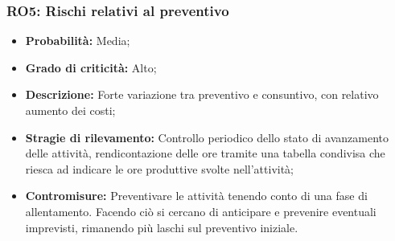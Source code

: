 \subsubsection{RO5: Rischi relativi al preventivo}
\begin{itemize}
    \item \textbf{Probabilità:} Media;
    \item \textbf{Grado di criticità:} Alto;
    \item \textbf{Descrizione:} Forte variazione tra preventivo e consuntivo, con relativo aumento
    dei costi;
    \item \textbf{Stragie di rilevamento:} Controllo periodico dello stato di avanzamento delle
    attività, rendicontazione delle ore tramite una tabella condivisa che riesca ad indicare le ore produttive svolte nell'attività;
    \item \textbf{Contromisure:} Preventivare le attività tenendo conto di una fase di allentamento. Facendo ciò si cercano di anticipare e prevenire eventuali imprevisti, rimanendo più laschi sul preventivo iniziale. 
\end{itemize}
